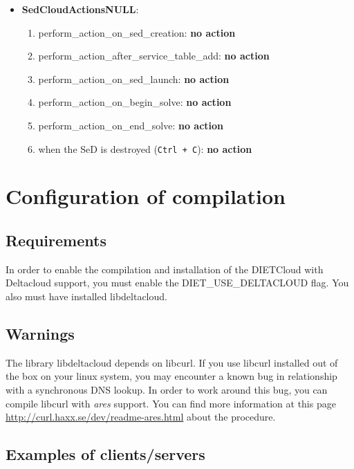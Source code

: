 \begin{itemize}
  \item \textbf{SedCloudActionsNULL}:
    \begin{enumerate}
        \item perform\_action\_on\_sed\_creation: \textbf{no action}
        \item perform\_action\_after\_service\_table\_add: \textbf{no action}
        \item perform\_action\_on\_sed\_launch: \textbf{no action}
        \item perform\_action\_on\_begin\_solve: \textbf{no action}
        \item perform\_action\_on\_end\_solve: \textbf{no action}
        \item when the SeD is destroyed (\texttt{Ctrl + C}): \textbf{no action}
   \end{enumerate}
\end{itemize}





\section{Configuration of compilation}

\subsection{Requirements}

In order to enable the compilation and installation of the DIETCloud
with Deltacloud support, you must enable the DIET\_USE\_DELTACLOUD
flag. You also must have installed libdeltacloud.

\subsection{Warnings}

The library libdeltacloud depends on libcurl. If you use libcurl
installed out of the box on your linux system, you may encounter a known bug
in relationship with a synchronous DNS lookup. In order to work around
this bug, you can compile libcurl with \emph{ares} support. You can find more
information at this page
\url{http://curl.haxx.se/dev/readme-ares.html} about the procedure.

\subsection{Examples of clients/servers}

